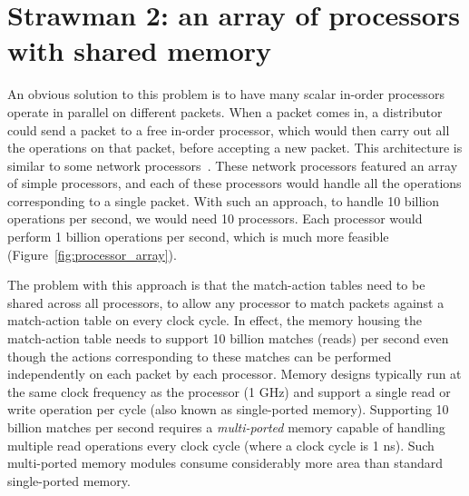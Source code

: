 \section{Strawman 2: an array of processors with shared memory}

An obvious solution to this problem is to have many scalar in-order processors
operate in parallel on different packets. When a packet comes in, a distributor
could send a packet to a free in-order processor, which would then carry out
all the operations on that packet, before accepting a new packet. This
architecture is similar to some network processors~\cite{ixp1200, ixp2800,
quantumflow}.  These network processors featured an array of simple processors,
and each of these processors would handle all the operations corresponding to a
single packet.  With such an approach, to handle 10 billion operations per
second, we would need 10 processors. Each processor would perform 1 billion
operations per second, which is much more feasible
(Figure~\ref{fig:processor_array}).

The problem with this approach is that the match-action tables need to be
shared across all processors, to allow any processor to match packets against a
match-action table on every clock cycle. In effect, the memory housing the
match-action table needs to support 10 billion matches (reads) per second even
though the actions corresponding to these matches can be performed
independently on each packet by each processor. Memory designs typically run at
the same clock frequency as the processor (1 GHz) and support a single read or
write operation per cycle (also known as single-ported memory). Supporting 10
billion matches per second requires a {\em multi-ported} memory capable of
handling multiple read operations every clock cycle (where a clock cycle is 1
ns). Such multi-ported memory modules consume considerably more area than
standard single-ported memory.

